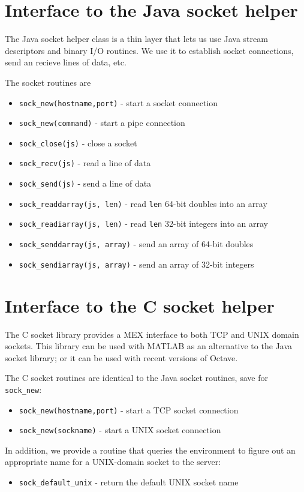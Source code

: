 \section{Interface to the Java socket helper}

The Java socket helper class is a thin layer that lets us use
Java stream descriptors and binary I/O routines.  We use it to
establish socket connections, send an recieve lines of data,
etc.

The socket routines are
\begin{itemize}
\item {\tt sock\_new(hostname,port)} - start a socket connection
\item {\tt sock\_new(command)} - start a pipe connection
\item {\tt sock\_close(js)} - close a socket
\item {\tt sock\_recv(js)} - read a line of data
\item {\tt sock\_send(js)} - send a line of data
\item {\tt sock\_readdarray(js, len)} - read {\tt len} 64-bit doubles
into an array
\item {\tt sock\_readiarray(js, len)} - read {\tt len} 32-bit integers
into an array
\item {\tt sock\_senddarray(js, array)} - send an array of 64-bit doubles
\item {\tt sock\_sendiarray(js, array)} - send an array of 32-bit integers
\end{itemize}

\section{Interface to the C socket helper}

The C socket library provides a MEX interface to both TCP and
UNIX domain sockets.  This library can be used with MATLAB as an
alternative to the Java socket library; or it can be used with
recent versions of Octave. 

The C socket routines are identical to the Java socket routines,
save for {\tt sock\_new}:
\begin{itemize}
\item {\tt sock\_new(hostname,port)} - start a TCP socket connection
\item {\tt sock\_new(sockname)} - start a UNIX socket connection
\end{itemize}

In addition, we provide a routine that queries the environment to
figure out an appropriate name for a UNIX-domain socket to the server:
\begin{itemize}
\item {\tt sock\_default\_unix} - return the default UNIX socket name
\end{itemize}
